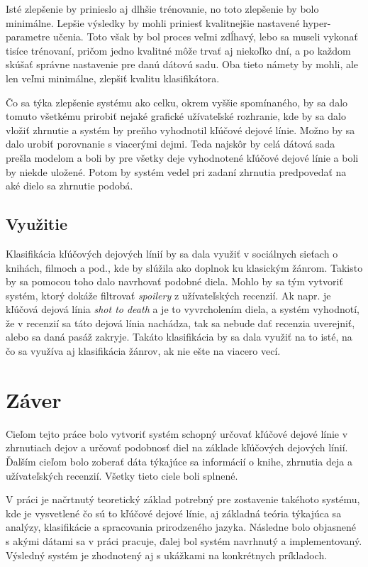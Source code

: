 Isté zlepšenie by prinieslo aj dlhšie trénovanie, no toto zlepšenie by bolo minimálne. Lepšie výsledky by mohli priniesť kvalitnejšie nastavené hyper-parametre učenia. Toto však by bol proces veľmi zdĺhavý, lebo sa museli vykonať tisíce trénovaní, pričom jedno kvalitné môže trvať aj niekoľko dní, a po každom skúšať správne nastavenie pre danú dátovú sadu. Oba tieto námety by mohli, ale len veľmi minimálne, zlepšiť kvalitu klasifikátora.

Čo sa týka zlepšenie systému ako celku, okrem vyššie spomínaného, by sa dalo tomuto všetkému prirobiť nejaké grafické užívateľské rozhranie, kde by sa dalo vložiť zhrnutie a systém by preňho vyhodnotil kľúčové dejové línie. Možno by sa dalo urobiť porovnanie s viacerými dejmi. Teda najskôr by celá dátová sada prešla modelom a boli by pre všetky deje vyhodnotené kľúčové dejové línie a boli by niekde uložené. Potom by systém vedel pri zadaní zhrnutia predpovedať na aké dielo sa zhrnutie podobá. 

\pagebreak
\section{Využitie}

Klasifikácia kľúčových dejových línií by sa dala využiť v sociálnych sieťach o knihách, filmoch a pod., kde by slúžila ako doplnok ku klasickým žánrom. Takisto by sa pomocou toho dalo navrhovať podobné diela. Mohlo by sa tým vytvoriť systém, ktorý dokáže filtrovať \textit{spoilery} z užívateľských recenzií. Ak napr. je kľúčová dejová línia \textit{shot to death} a je to vyvrcholením diela, a systém vyhodnotí, že v recenzií sa táto dejová línia nachádza, tak sa nebude dať recenzia uverejniť, alebo sa daná pasáž zakryje. Takáto klasifikácia by sa dala využiť na to isté, na čo sa využíva aj klasifikácia žánrov, ak nie ešte na viacero vecí.


\chapter{Záver}
\label{zaver}

Cieľom tejto práce bolo vytvoriť systém schopný určovať kľúčové dejové línie v zhrnutiach dejov a určovať podobnosť diel na základe kľúčových dejových línií. Ďalším cieľom bolo zoberať dáta týkajúce sa informácií o knihe, zhrnutia deja a užívateľských recenzií. Všetky tieto ciele boli splnené. 

V práci je načrtnutý teoretický základ potrebný pre zostavenie takéhoto systému, kde je vysvetlené čo sú to kľúčové dejové línie, aj základná teória týkajúca sa analýzy, klasifikácie a spracovania prirodzeného jazyka. Následne bolo objasnené s akými dátami sa v práci pracuje, ďalej bol systém navrhnutý a implementovaný. Výsledný systém je zhodnotený aj s ukážkami na konkrétnych príkladoch.

